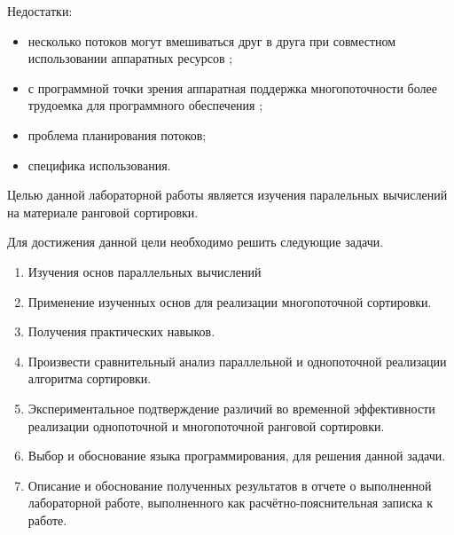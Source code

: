 Недостатки:
\begin{itemize}
	\item несколько потоков могут вмешиваться друг в друга при совместном использовании аппаратных ресурсов \cite{Nemirovsky};
	\item с программной точки зрения аппаратная поддержка многопоточности более трудоемка для программного обеспечения \cite{Olukotun};
	\item проблема планирования потоков;
	\item специфика использования. 
\end{itemize}

Целью данной лабораторной работы является изучения паралельных вычислений на материале ранговой сортировки.


Для достижения данной цели необходимо решить следующие задачи.


\begin{enumerate}
	\item Изучения основ параллельных вычислений
	\item Применение изученных основ для реализации многопоточной сортировки.

	\item Получения практических навыков.
	\item Произвести сравнительный анализ параллельной и однопоточной реализации алгоритма сортировки.
	\item Экспериментальное подтверждение различий во временной эффективности реализации однопоточной и многопоточной ранговой сортировки.
	\item Выбор и обоснование языка программирования, для решения данной задачи.
	\item Описание и обоснование полученных результатов в отчете о выполненной лабораторной работе, выполненного как расчётно-пояснительная записка к работе.
\end{enumerate}
